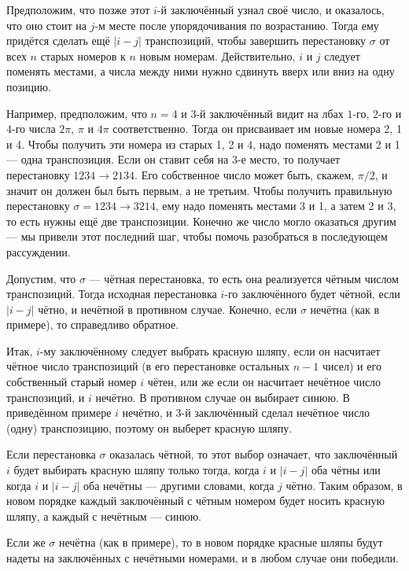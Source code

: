Предположим, что позже этот $i$-й заключённый узнал своё число, и оказалось, что оно стоит на $j$-м месте после упорядочивания по возрастанию.
Тогда ему придётся сделать ещё $|i - j|$ транспозиций, чтобы завершить перестановку $\sigma$ от всех $n$ старых номеров к $n$ новым номерам.
Действительно, $i$ и $j$ следует поменять местами, а числа между ними нужно сдвинуть вверх или вниз на одну позицию.

Например, предположим, что $n = 4$ и $3$-й заключённый видит на лбах $1$-го, $2$-го и $4$-го числа $2\pi$, $\pi$ и $4\pi$ соответственно.
Тогда он присваивает им новые номера 2, 1 и 4.
Чтобы получить эти номера из старых 1, 2 и 4, надо поменять местами 2 и 1 --- одна транспозиция.
Если он ставит себя на 3-е место, то получает перестановку $1234 \to  2134$.
Его собственное число может быть, скажем, $\pi/2$, и значит он должен был быть первым, а не третьим.
Чтобы получить правильную перестановку  $\sigma  = 1234 \to  3214$, ему надо поменять местами 3 и 1, а затем 2 и 3, то есть нужны ещё две транспозиции.
Конечно же число могло оказаться другим --- мы привели этот последний шаг, чтобы помочь разобраться в последующем  рассуждении.

Допустим, что $\sigma$ --- чётная перестановка, то есть она реализуется чётным числом транспозиций.
Тогда исходная перестановка $i$-го заключённого будет чётной, если $|i - j|$ чётно, и нечётной в противном случае.
Конечно, если $\sigma$ нечётна (как в примере), то справедливо обратное.

Итак, $i$-му заключённому следует выбрать красную шляпу, если он насчитает чётное число транспозиций (в его перестановке остальных $n - 1$ чисел) и его собственный старый номер $i$ чётен, или же если он насчитает нечётное число транспозиций, и $i$ нечётно.
В противном случае он выбирает синюю.
В приведённом примере $i$ нечётно, и $3$-й заключённый сделал нечётное число (одну) транспозицию, поэтому он выберет красную шляпу.

Если перестановка $\sigma$ оказалась чётной, то этот выбор означает, что заключённый $i$ будет выбирать красную шляпу только тогда, когда $i$ и $|i - j|$ оба чётны или когда $i$ и $|i - j|$ оба нечётны --- другими словами, когда $j$ чётно.
Таким образом, в новом порядке каждый заключённый с чётным номером будет носить красную шляпу, а каждый с нечётным --- синюю.

Если же $\sigma$ нечётна (как в примере), то в новом порядке красные шляпы будут надеты на заключённых с нечётными номерами, и в любом случае они победили.

